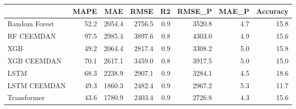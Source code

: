 \begin{tabular}{lrrrrrrr}
\toprule
{} &  MAPE &    MAE &   RMSE &  R2 &  RMSE\_P &  MAE\_P &  Accuracy \\
\midrule
Random Forest &  52.2 & 2054.4 & 2756.5 & 0.9 &  3520.8 &    4.7 &      15.8 \\
RF CEEMDAN    &  97.5 & 2985.4 & 3897.6 & 0.8 &  4303.0 &    4.9 &      15.6 \\
XGB           &  49.2 & 2064.4 & 2817.4 & 0.9 &  3308.2 &    5.0 &      15.8 \\
XGB CEEMDAN   &  70.1 & 2617.1 & 3459.0 & 0.8 &  3917.5 &    5.0 &      15.0 \\
LSTM          &  68.3 & 2238.9 & 2907.1 & 0.9 &  3284.1 &    4.5 &      18.6 \\
LSTM CEEMDAN  &  49.3 & 1860.3 & 2482.4 & 0.9 &  2967.2 &    5.3 &      11.7 \\
Transformer   &  43.6 & 1780.9 & 2403.4 & 0.9 &  2726.8 &    4.3 &      15.6 \\
\bottomrule
\end{tabular}
